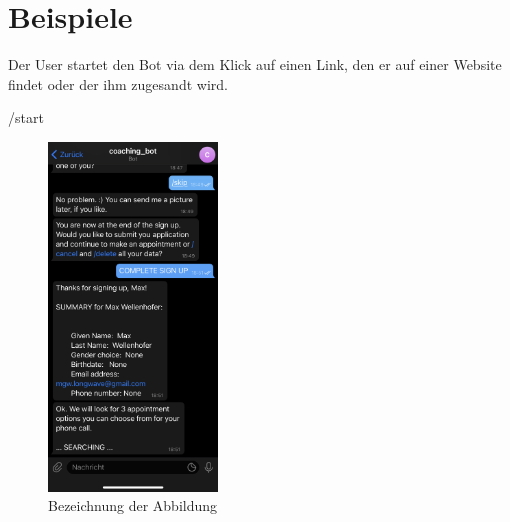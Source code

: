 \label{Beispiele}
\chapter{Beispiele}

Der User startet den Bot via dem Klick auf einen Link, den er auf einer Website findet oder der ihm zugesandt wird.

/start
\begin{figure}
	\centering
	\includegraphics[width=0.4\textwidth]{images/coaching_bot_dummy_screenshot.jpeg}
	\caption{Bezeichnung der Abbildung}
	\label{fig: Abbildung 1}
\end{figure}


